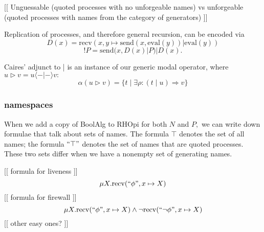 \documentclass{article}
\newcommand{\maps}{\colon}
\newcommand{\send}{\mathrm{send}}
\newcommand{\recv}{\mathrm{recv}}
\renewcommand{\quote}[1]{``#1"}
\newcommand{\deref}[1]{\mathrm{eval}(#1)}
\begin{document}
[[ Unguessable (quoted processes with no unforgeable names) vs unforgeable (quoted processes with names from the category of generators) ]]

Replication of processes, and therefore general recursion, can be encoded via
\[D(x) = \recv(x, y\mapsto \send(x, \deref{y}) | \deref{y})\]
\[!P = \send(x, D(x) | P) | D(x).\]

Caires' adjunct to | is an instance of our generic modal operator, where $u \triangleright v = u \langle - | - \rangle v:$
\[ \alpha(u \triangleright v) = \{ t \;|\; \exists \rho\maps (t\;|\;u) \Rightarrow v\} \]

\subsubsection{namespaces}

When we add a copy of BoolAlg to RHOpi for both $N$ and $P,$ we can write down formulae that talk about sets of names.  The formula $\top$ denotes the set of all names; the formula $\quote{\top}$ denotes the set of names that are quoted processes.  These two sets differ when we have a nonempty set of generating names.

[[ formula for liveness ]]
\[ \mu X. \recv(\quote{\phi}, x \mapsto X) \]
[[ formula for firewall ]]
\[ \mu X. \recv(\quote{\phi}, x \mapsto X) \land \neg \recv(\quote{\neg\phi}, x \mapsto X) \]
[[ other easy ones? ]]

\end{document}
